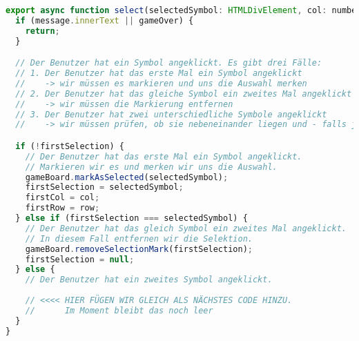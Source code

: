 \documentclass{article}
\begin{document}
    \begin{lstlisting}[language=JavaScript]
export async function select(selectedSymbol: HTMLDivElement, col: number, row: number) {
  if (message.innerText || gameOver) {
    return;
  }

  // Der Benutzer hat ein Symbol angeklickt. Es gibt drei Fälle:
  // 1. Der Benutzer hat das erste Mal ein Symbol angeklickt
  //    -> wir müssen es markieren und uns die Auswahl merken
  // 2. Der Benutzer hat das gleiche Symbol ein zweites Mal angeklickt
  //    -> wir müssen die Markierung entfernen
  // 3. Der Benutzer hat zwei unterschiedliche Symbole angeklickt
  //    -> wir müssen prüfen, ob sie nebeneinander liegen und - falls ja - dann tauschen

  if (!firstSelection) {
    // Der Benutzer hat das erste Mal ein Symbol angeklickt.
    // Markieren wir es und merken wir uns die Auswahl.
    gameBoard.markAsSelected(selectedSymbol);
    firstSelection = selectedSymbol;
    firstCol = col;
    firstRow = row;
  } else if (firstSelection === selectedSymbol) {
    // Der Benutzer hat das gleich Symbol ein zweites Mal angeklickt.
    // In diesem Fall entfernen wir die Selektion.
    gameBoard.removeSelectionMark(firstSelection);
    firstSelection = null;
  } else {
    // Der Benutzer hat ein zweites Symbol angeklickt.
    
    // <<<< HIER FÜGEN WIR GLEICH ALS NÄCHSTES CODE HINZU.
    //      Im Moment bleibt das noch leer
  }
}
    \end{lstlisting}
    
    \vspace{0.5cm}


    \newpage


\end{document}
